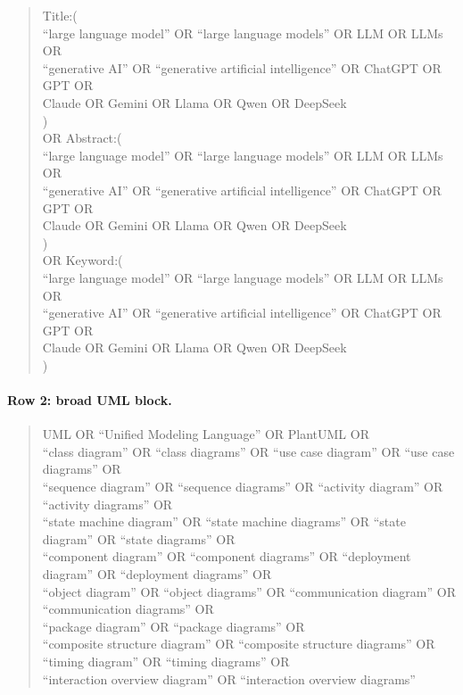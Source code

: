 \begin{quote}
\begin{minipage}{0.96\textwidth}
\scriptsize\ttfamily\raggedright
Title:(\\
\quad ``large language model'' OR ``large language models'' OR LLM OR LLMs OR\\
\quad ``generative AI'' OR ``generative artificial intelligence'' OR ChatGPT OR GPT OR\\
\quad Claude OR Gemini OR Llama OR Qwen OR DeepSeek\\
)\\
OR Abstract:(\\
\quad ``large language model'' OR ``large language models'' OR LLM OR LLMs OR\\
\quad ``generative AI'' OR ``generative artificial intelligence'' OR ChatGPT OR GPT OR\\
\quad Claude OR Gemini OR Llama OR Qwen OR DeepSeek\\
)\\
OR Keyword:(\\
\quad ``large language model'' OR ``large language models'' OR LLM OR LLMs OR\\
\quad ``generative AI'' OR ``generative artificial intelligence'' OR ChatGPT OR GPT OR\\
\quad Claude OR Gemini OR Llama OR Qwen OR DeepSeek\\
)
\end{minipage}
\end{quote}

\paragraph{Row 2: broad UML block.}

\begin{quote}
\begin{minipage}{0.96\textwidth}
\scriptsize\ttfamily\raggedright
UML OR ``Unified Modeling Language'' OR PlantUML OR\\
``class diagram'' OR ``class diagrams'' OR ``use case diagram'' OR ``use case diagrams'' OR\\
``sequence diagram'' OR ``sequence diagrams'' OR ``activity diagram'' OR ``activity diagrams'' OR\\
``state machine diagram'' OR ``state machine diagrams'' OR ``state diagram'' OR ``state diagrams'' OR\\
``component diagram'' OR ``component diagrams'' OR ``deployment diagram'' OR ``deployment diagrams'' OR\\
``object diagram'' OR ``object diagrams'' OR ``communication diagram'' OR ``communication diagrams'' OR\\
``package diagram'' OR ``package diagrams'' OR\\
``composite structure diagram'' OR ``composite structure diagrams'' OR\\
``timing diagram'' OR ``timing diagrams'' OR\\
``interaction overview diagram'' OR ``interaction overview diagrams''
\end{minipage}
\end{quote}

